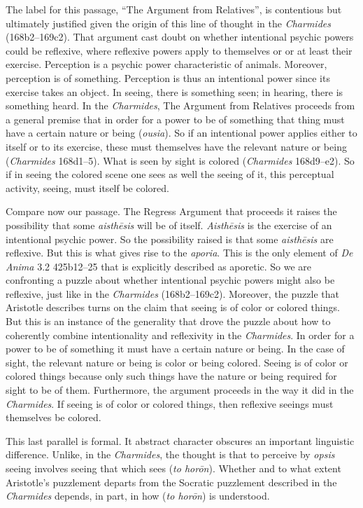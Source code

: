 The label for this passage, ``The Argument from Relatives'', is contentious but ultimately justified given the origin of this line of thought in the \emph{Charmides} (168b2–169c2). That argument cast doubt on whether intentional psychic powers could be reflexive, where reflexive powers apply to themselves or or at least their exercise. Perception is a psychic power characteristic of animals. Moreover, perception is of something. Perception is thus an intentional power since its exercise takes an object. In seeing, there is something seen; in hearing, there is something heard. In the \emph{Charmides}, The Argument from Relatives proceeds from a general premise that in order for a power to be of something that thing must have a certain nature or being (\emph{ousia}). So if an intentional power applies either to itself or to its exercise, these must themselves have the relevant nature or being (\emph{Charmides} 168d1–5). What is seen by sight is colored (\emph{Charmides} 168d9–e2). So if in seeing the colored scene one sees as well the seeing of it, this perceptual activity, seeing, must itself be colored.

Compare now our passage. The Regress Argument that proceeds it raises the possibility that some \emph{aisthēsis} will be of itself. \emph{Aisthēsis} is the exercise of an intentional psychic power. So the possibility raised is that some \emph{aisthēsis} are reflexive. But this is what gives rise to the \emph{aporia}. This is the only element of \emph{De Anima} 3.2 425b12–25 that is explicitly described as aporetic. So we are confronting a puzzle about whether intentional psychic powers might also be reflexive, just like in the \emph{Charmides} (168b2–169c2). Moreover, the puzzle that Aristotle describes turns on the claim that seeing is of color or colored things. But this is an instance of the generality that drove the puzzle about how to coherently combine intentionality and reflexivity in the \emph{Charmides}. In order for a power to be of something it must have a certain nature or being. In the case of sight, the relevant nature or being is color or being colored. Seeing is of color or colored things because only such things have the nature or being required for sight to be of them. Furthermore, the argument proceeds in the way it did in the \emph{Charmides}. If seeing is of color or colored things, then reflexive seeings must themselves be colored.

This last parallel is formal. It abstract character obscures an important linguistic difference. Unlike, in the \emph{Charmides}, the thought is that to perceive by \emph{opsis} seeing involves seeing that which sees (\emph{to horōn}). Whether and to what extent Aristotle's puzzlement departs from the Socratic puzzlement described in the \emph{Charmides} depends, in part, in how (\emph{to horōn}) is understood.

